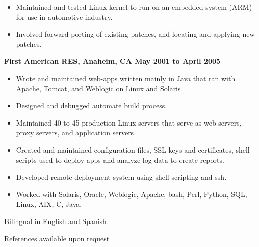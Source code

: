\documentclass{res}
\begin{document}
\begin{resume}
\begin{itemize}
\item
	Maintained and tested Linux kernel to run on an embedded system
	(ARM) for use in automotive industry.

\item
	Involved forward porting of existing patches, and locating and
	applying new patches.

\end{itemize}


{\large \bf First American RES, Anaheim, CA \hfill May 2001 to April 2005}

\begin{itemize}

\item
	Wrote and maintained web-apps written mainly in Java that ran
	with Apache, Tomcat, and Weblogic on Linux and Solaris.
\item
	Designed and debugged automate build process.
\item
	Maintained 40 to 45 production Linux servers that serve as
	web-servers, proxy servers, and application servers.
\item
	Created and maintained configuration files, SSL keys and
	certificates, shell scripts used to deploy apps and analyze log
	data to create reports.

\item
	Developed remote deployment system using shell scripting and ssh.

\item
	Worked with Solaris, Oracle, Weblogic, Apache, bash, Perl,
	Python, SQL, Linux, AIX, C, Java.

\end{itemize}

Bilingual in English and Spanish

References available upon request

\end{resume}
\end{document}

